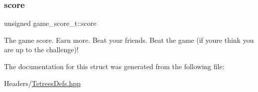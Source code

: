 \subsubsection{\texorpdfstring{score}{score}}
{\footnotesize\ttfamily unsigned game\+\_\+score\+\_\+t\+::score}

The game score. Earn more. Beat your friends. Beat the game (if you\textquotesingle{}re think you are up to the challenge)! 

The documentation for this struct was generated from the following file\+:\begin{DoxyCompactItemize}
\item 
Headers/\hyperlink{TetreesDefs_8hpp}{Tetrees\+Defs.\+hpp}\end{DoxyCompactItemize}
